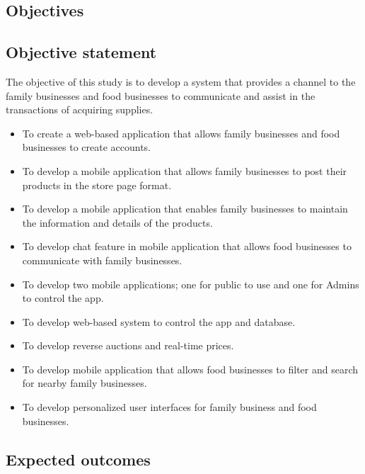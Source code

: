 \documentclass[11pt]{article}
\newcommand\tab[1][1cm]{\hspace*{#1}}
\begin{document}
\begin{center}
\section{Objectives}
\end{center}

\subsection{Objective statement}
\tab The objective of this study is to develop a system that provides a channel to the family businesses and food businesses to communicate and assist in the transactions of acquiring supplies. 

\begin{itemize}
\item To create a web-based application that allows family businesses and food businesses to create accounts.

\item To develop a mobile application that allows family businesses to post their products in the store page format.

\item To develop a mobile application that enables family businesses to maintain the information and details of the products.

\item To develop chat feature in mobile application that allows food businesses to communicate with family businesses.

\item To develop two mobile applications; one for public to use and one for Admins to control the app. 

\item To develop web-based system to control the app and database.

\item To develop reverse auctions and real-time prices. 

\item To develop mobile application that allows food businesses to filter and search for nearby family businesses.

\item To develop personalized user interfaces for family business and food businesses.



\end{itemize}

\newpage 
\begin{center}
\section{Expected outcomes}

\end{center}
\end{document}
